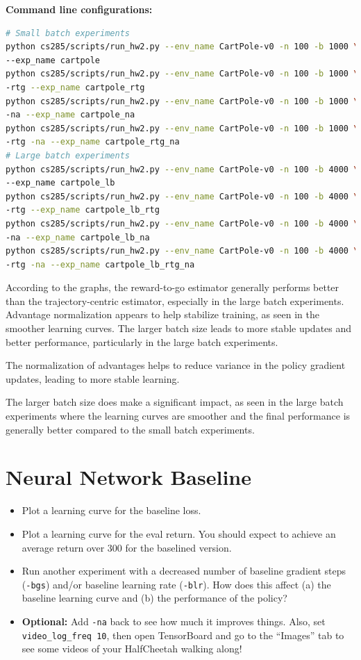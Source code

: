 \documentclass{article}
\begin{document}
\textbf{Command line configurations:}
\begin{lstlisting}[language=bash]
# Small batch experiments
python cs285/scripts/run_hw2.py --env_name CartPole-v0 -n 100 -b 1000 \
--exp_name cartpole
python cs285/scripts/run_hw2.py --env_name CartPole-v0 -n 100 -b 1000 \
-rtg --exp_name cartpole_rtg
python cs285/scripts/run_hw2.py --env_name CartPole-v0 -n 100 -b 1000 \
-na --exp_name cartpole_na
python cs285/scripts/run_hw2.py --env_name CartPole-v0 -n 100 -b 1000 \
-rtg -na --exp_name cartpole_rtg_na
# Large batch experiments
python cs285/scripts/run_hw2.py --env_name CartPole-v0 -n 100 -b 4000 \
--exp_name cartpole_lb
python cs285/scripts/run_hw2.py --env_name CartPole-v0 -n 100 -b 4000 \
-rtg --exp_name cartpole_lb_rtg
python cs285/scripts/run_hw2.py --env_name CartPole-v0 -n 100 -b 4000 \
-na --exp_name cartpole_lb_na
python cs285/scripts/run_hw2.py --env_name CartPole-v0 -n 100 -b 4000 \
-rtg -na --exp_name cartpole_lb_rtg_na

\end{lstlisting}


According to the graphs, the reward-to-go estimator generally performs better than the trajectory-centric estimator, especially in the large batch experiments. Advantage normalization appears to help stabilize training, as seen in the smoother learning curves. The larger batch size leads to more stable updates and better performance, particularly in the large batch experiments.

The normalization of advantages helps to reduce variance in the policy gradient updates, leading to more stable learning.

The larger batch size does make a significant impact, as seen in the large batch experiments where the learning curves are smoother and the final performance is generally better compared to the small batch experiments.


\newpage\section{Neural Network Baseline}
\begin{itemize}
    \item Plot a learning curve for the baseline loss.
    \item Plot a learning curve for the eval return. You should expect to achieve an average return over 300 for the baselined version.
    \item Run another experiment with a decreased number of baseline gradient steps (\verb|-bgs|) and/or baseline learning rate (\verb|-blr|). How does this affect (a) the baseline learning curve and (b) the performance of the policy?
    \item \textbf{Optional:} Add \verb|-na| back to see how much it improves things. Also, set \verb|video_log_freq 10|, then open TensorBoard and go to the ``Images'' tab to see some videos of your HalfCheetah walking along!
\end{itemize}
\end{document}
